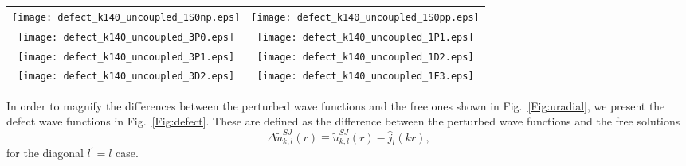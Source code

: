 \documentclass[aps,twocolumn,showpacs,preprintnumbers,amsmath,amssymb,nofootinbib,superscriptaddress,showkeys,noeprint]{revtex4-1}
\begin{document}
\begin{figure*}[!ht]
\begin{tabular}{cc}
\texttt{[image: defect\_k140\_uncoupled\_1S0np.eps]}&
\texttt{[image: defect\_k140\_uncoupled\_1S0pp.eps]}\\
\texttt{[image: defect\_k140\_uncoupled\_3P0.eps]}&
\texttt{[image: defect\_k140\_uncoupled\_1P1.eps]}\\
\texttt{[image: defect\_k140\_uncoupled\_3P1.eps]}&
\texttt{[image: defect\_k140\_uncoupled\_1D2.eps]}\\
\texttt{[image: defect\_k140\_uncoupled\_3D2.eps]}&
\texttt{[image: defect\_k140\_uncoupled\_1F3.eps]}
\end{tabular}
\caption{Defect wave functions
  $\Delta\widetilde{u}^{SJ}_{k,l}(r)\equiv
  \widetilde{u}^{SJ}_{k,l}(r)-\hat{j}_l(kr)$ for the uncoupled N-N
  partial waves, $l^\prime=l$.  The results are given for relative
  momentum $k=140$ MeV/c and for the same values of the CM momentum as
  in Fig.~\ref{Fig:uradial}.  The results for $K_{\rm CM}=0$ MeV/c
  (solid purple lines) are the same as those shown as short-dashed
  green lines in Fig. 1 of Ref.~\cite{RuizSimo:2017tcb}, but on a
  different vertical scale.  Notice that the scales on the vertical
  axes are, in general, different for each partial wave as well.}
\label{Fig:defect}
\end{figure*}

In order to magnify the differences between the perturbed wave
functions and the free ones shown in Fig.~\ref{Fig:uradial}, we
present the defect wave functions in Fig.~\ref{Fig:defect}. These are
defined as the difference between the perturbed wave functions and the
free solutions
\begin{equation}\label{eq:defect}
\Delta\widetilde{u}^{SJ}_{k,l}(r)
\equiv
\widetilde{u}^{SJ}_{k,l}(r)-\hat{j}_l(kr),
\end{equation}
for the diagonal $l^\prime=l$ case.
\end{document}
